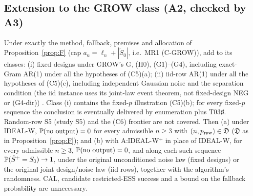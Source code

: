 \subsection{Extension to the GROW class (A2, checked by A3)}
\begin{proposition}\label{prop:FG}
Under exactly the method, fallback, premises and allocation of Proposition~\ref{prop:F} (cap $a_n=\ell_n+|\tilde S_0|$, i.e.\ MR1 (C-GROW)), add to its classes: (i) fixed designs under GROW's G, (H0), (G1)--(G4), including exact-Gram AR(1) under all the hypotheses of (C5)(a); (ii) iid-row AR(1) under all the hypotheses of (C5)(c), including independent Gaussian noise and the separation condition (the iid instance uses its joint-law event theorem, not fixed-design NEG or (G4-dir)) . Class (i) contains the fixed-$p$ illustration (C5)(b); for every fixed-$p$ sequence the conclusion is eventually delivered by enumeration plus T03♯. Random-row S5 (study S5) and the (C6) frontier are not covered. Then (a) under IDEAL-W, $\mathbb P(\text{no output})=0$ for every admissible $n\ge3$ with $(n,p_{\rm raw})\in\mathfrak D$ ($\mathfrak D$ as in Proposition~\ref{prop:F}); and (b) with A:IDEAL-W$^{+}$ in place of IDEAL-W, for every admissible $n\ge3$, $\mathbb P(\text{no output})=0$, and along each such sequence $\mathbb P(\hat S^{+}=S_0)\to1$, under the original unconditioned noise law (fixed designs) or the original joint design/noise law (iid rows), together with the algorithm\textquoteright s randomness. CAL, candidate restricted-ESS success and a bound on the fallback probability are unnecessary.
\end{proposition}
